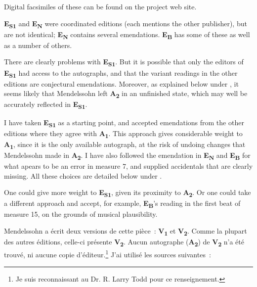 \documentclass[a4paper, 12pt]{book}
\newcommand{\source}[2]{\textbf{#1\textsubscript{#2}}}
\newcommand{\bigdot}[0]{{\Large \textbullet}}
\newcommand{\centerbigdot}[0]{\begin{center}\bigdot\end{center}}
\begin{document}
{    Digital facsimiles of these can be found on the project web
    site.

    \source{E}{S1} and \source{E}{N} were coordinated editions (each
    mentions the other publisher), but are not identical;
    \source{E}{N} contains several emendations. \source{E}{B} has some
    of these as well as a number of others.

    There are clearly problems with \source{E}{S1}. But it is possible
    that only the editors of \source{E}{S1} had access to the
    autographs, and that the variant readings in the other editions
    are conjectural emendations. Moreover, as explained below under
    , it seems likely that Mendelssohn left
    \source{A}{2} in an unfinished state, which may well be accurately
    reflected in \source{E}{S1}.

    I have taken \source{E}{S1} as a starting point, and accepted
    emendations from the other editions where they agree with
    \source{A}{1}. This approach gives considerable weight to
    \source{A}{1}, since it is the only available autograph, at the
    risk of undoing changes that Mendelssohn made in \source{A}{2}.  I
    have also followed the emendation in \source{E}{N} and
    \source{E}{B} for what apears to be an error in measure 7, and
    supplied accidentals that are clearly missing. All these choices
    are detailed below under .

    One could give more weight to \source{E}{S1}, given its proximity
    to \source{A}{2}. Or one could take a different approach and
    accept, for example, \source{E}{B}'s reading in the first beat of
    measure 15, on the grounds of musical plausibility.

    \centerbigdot

    \begin{otherlanguage}{french}
    Mendelssohn a écrit deux versions de cette pièce~: \source{V}{1}
    et \source{V}{2}. Comme la plupart des autres éditions, celle-ci
    présente \source{V}{2}. Aucun autographe (\source{A}{2}) de
    \source{V}{2} n'a été trouvé, ni aucune copie
    d'éditeur.\footnote{Je suis reconnaissant au Dr. R. Larry Todd
    pour ce renseignement.} J'ai utilisé les sources suivantes~:
    

\end{otherlanguage}}
\end{document}
